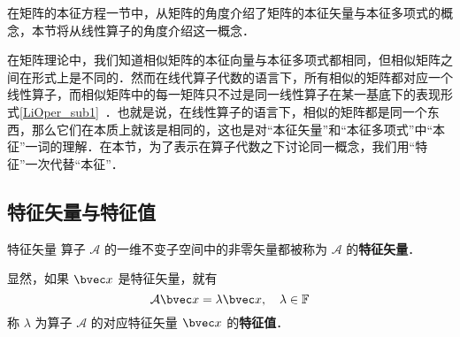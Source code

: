 在矩阵的本征方程一节中，从矩阵的角度介绍了矩阵的本征矢量与本征多项式的概念，本节将从线性算子的角度介绍这一概念．

在矩阵理论中，我们知道相似矩阵的本征向量与本征多项式都相同，但相似矩阵之间在形式上是不同的．然而在线代算子代数的语言下，所有相似的矩阵都对应一个线性算子，而相似矩阵中的每一矩阵只不过是同一线性算子在某一基底下的表现形式\autoref{LiOper_sub1}~．也就是说，在线性算子的语言下，相似的矩阵都是同一个东西，那么它们在本质上就该是相同的，这也是对“本征矢量”和“本征多项式”中“本征”一词的理解．在本节，为了表示在算子代数之下讨论同一概念，我们用“特征”一次代替“本征”．
\subsection{特征矢量与特征值}
\begin{definition}{特征矢量}
算子 $\mathcal{A}$ 的一维不变子空间中的非零矢量都被称为 $\mathcal{A}$ 的\textbf{特征矢量}．
\end{definition}
显然，如果 $\bvec x$ 是特征矢量，就有
\begin{equation}
\mathcal{A}\bvec x=\lambda \bvec x,\quad \lambda\in\mathbb{F}
\end{equation}
称 $\lambda$ 为算子 $\mathcal{A}$ 的对应特征矢量 $\bvec x$ 的\textbf{特征值}．